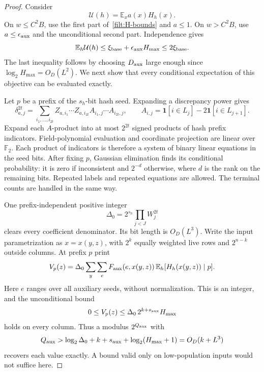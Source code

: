 \documentclass[11pt,letterpaper]{article}
\theoremstyle{definition}
\theoremstyle{remark}
\begin{document}
\begin{proof}
Consider
\[
 \mathcal U(h)=\mathbb E_x a(x)H_h(x).
\]
On $w\le C^2B$, use the first part of~\eqref{filt:H-bounds} and
$a\le1$.  On $w>C^2B$, use $a\le\epsilon_{\rm aux}$ and the
unconditional second part.  Independence gives
\begin{equation}\label{filt:initial-objective}
 \mathbb E_h\mathcal U(h)
 \le \xi_{\rm base}+\epsilon_{\rm aux}H_{\max}
 \le 2\xi_{\rm base}.
\end{equation}
The last inequality follows by choosing $D_{\rm aux}$ large enough
since $\log_2H_{\max}=O_D(L^2)$.  We next show that every conditional
expectation of this objective can be evaluated exactly.

Let $p$ be a prefix of the $s_h$-bit hash seed.  Expanding a discrepancy
power gives
\[
 \delta_{a,j}^{2t}=
 \sum_{i_1,\ldots,i_{2t}}
 Z_{a,i_1}\cdots Z_{a,i_{2t}}
 A_{i_1,j}\cdots A_{i_{2t},j},
 \qquad
 A_{i,j}=\mathbf1[i\in L_j]-2\mathbf1[i\in L_{j+1}].
\]
Expand each $A$-product into at most $2^{2t}$ signed products of hash
prefix indicators.  Field-polynomial evaluation and coordinate
projection are linear over $\mathbb F_2$.  Each product of indicators
is therefore a system of binary linear equations in the seed bits.
After fixing $p$, Gaussian elimination finds its conditional
probability: it is zero if inconsistent and $2^{-d}$ otherwise, where
$d$ is the rank on the remaining bits.  Repeated labels and repeated
equations are allowed.  The terminal counts are handled in the same
way.

One prefix-independent positive integer
\begin{equation}\label{filt:common-scale}
 \Delta_0=2^{s_h}\prod_{j<J}W_j^{2t}
\end{equation}
clears every coefficient denominator.  Its bit length is $O_D(L^3)$.
Write the input parametrization as $x=x(y,z)$, with $2^k$ equally
weighted live rows and $2^{n-k}$ outside columns.  At prefix $p$ print
\begin{equation}\label{filt:column-potential}
 V_p(z)=\Delta_0\sum_{y}\sum_e
 F_{\rm aux}(e,x(y,z))\,
 \mathbb E_h[H_h(x(y,z))\mid p].
\end{equation}
Here $e$ ranges over all auxiliary seeds, without normalization.
This is an integer, and the unconditional bound
\begin{equation}\label{filt:column-bound}
 0\le V_p(z)\le\Delta_0\,2^{k+s_{\rm aux}}H_{\max}
\end{equation}
holds on every column.  Thus a modulus $2^{Q_{\rm aux}}$ with
\begin{equation}\label{filt:aux-precision}
 Q_{\rm aux}>
 \log_2\Delta_0+k+s_{\rm aux}+\log_2(H_{\max}+1)
 =O_D(k+L^3)
\end{equation}
recovers each value exactly.  A bound valid only on low-population
inputs would not suffice here.


\end{proof}
\end{document}
